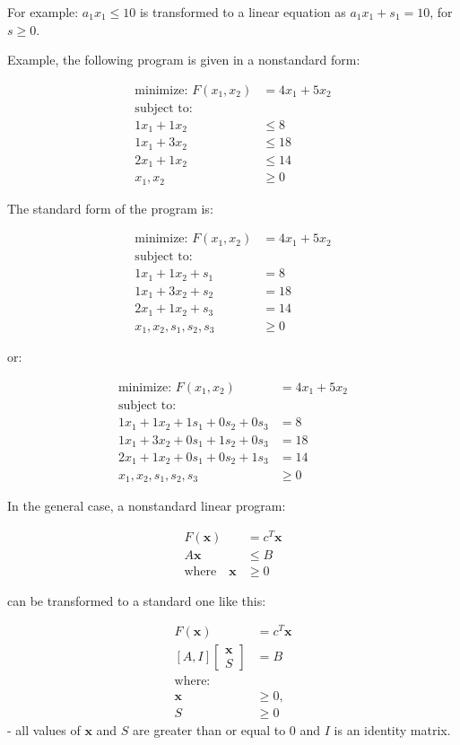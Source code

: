 \documentclass[11pt]{article}
\begin{document}
For example: \(a_1 x_1 \leq 10\) is transformed to a linear equation as
\(a_1 x_1 + s_1 = 10\), for \(s \geq 0\).

Example, the following program is given in a nonstandard form:

\[
\begin{aligned}
\text{minimize: } F(x_1, x_2) &= 4x_1 + 5x_2 \\
\text{subject to:} \\
1x_1 + 1x_2 &\leq 8 \\
1x_1 + 3x_2 &\leq 18 \\
2x_1 + 1x_2 &\leq 14 \\
x_1, x_2 &\geq 0
\end{aligned}
\]

The standard form of the program is:

\[
\begin{aligned}
\text{minimize: } F(x_1, x_2) &= 4x_1 + 5x_2 \\
\text{subject to:} \\
1x_1 + 1x_2 + s_1 &= 8 \\
1x_1 + 3x_2 + s_2 &= 18 \\
2x_1 + 1x_2 + s_3 &= 14 \\
x_1, x_2, s_1, s_2, s_3 &\geq 0
\end{aligned}
\]

or:

\[
\begin{aligned}
\text{minimize: } F(x_1, x_2) &= 4x_1 + 5x_2 \\
\text{subject to: } \\
1x_1 + 1x_2 + 1s_1 + 0s_2 + 0s_3 &= 8 \\
1x_1 + 3x_2 + 0s_1 + 1s_2 + 0s_3 &= 18 \\
2x_1 + 1x_2 + 0s_1 + 0s_2 + 1s_3 &= 14 \\
x_1, x_2, s_1, s_2, s_3 &\geq 0
\end{aligned}
\]

In the general case, a nonstandard linear program:

\[
\begin{aligned}
F(\pmb{x}) &= c^T \pmb{x} \\
A \pmb{x} &\leq B \\
\text{where} \quad \pmb{x} &\geq 0
\end{aligned}
\]

can be transformed to a standard one like this:

\[
\begin{aligned}
F(\pmb{x}) &= c^T \pmb{x} \\
[A, I] \begin{bmatrix} \pmb{x} \\ S \end{bmatrix} &= B \\
\text{where:} \\
\pmb{x} &\geq 0, \\
S &\geq 0
\end{aligned}
\] - all values of \(\pmb{x}\) and \(S\) are greater than or equal to
\(0\) and \(I\) is an identity matrix.
\end{document}

